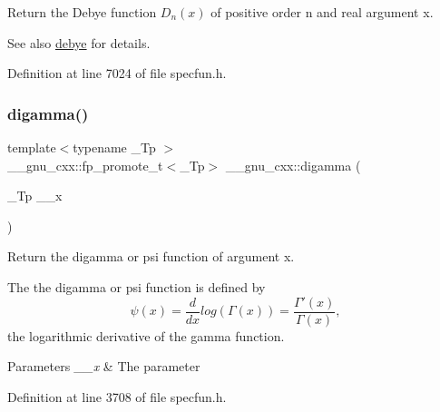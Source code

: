 Return the Debye function $ D_n(x) $ of positive order {\ttfamily n} and real argument {\ttfamily x}.

\begin{DoxySeeAlso}{See also}
\hyperlink{group__mathsf__gnu_ga0b14de47c011de3ebf771c9f29b2b78c}{debye} for details. 
\end{DoxySeeAlso}


Definition at line 7024 of file specfun.\+h.

\mbox{\label{group__mathsf__gnu_ga7b87300edf8754d959e1d94fe0c9246e}} 
\subsubsection{\texorpdfstring{digamma()}{digamma()}}
{\footnotesize\ttfamily template$<$typename \+\_\+\+Tp $>$ \\
\+\_\+\+\_\+gnu\+\_\+cxx\+::fp\+\_\+promote\+\_\+t$<$\+\_\+\+Tp$>$ \+\_\+\+\_\+gnu\+\_\+cxx\+::digamma (\begin{DoxyParamCaption}\item[{\+\_\+\+Tp}]{\+\_\+\+\_\+x }\end{DoxyParamCaption})\hspace{0.3cm}{\ttfamily [inline]}}

Return the digamma or psi function of argument {\ttfamily x}.

The the digamma or psi function is defined by \[ \psi(x) = \frac{d}{dx}log\left(\Gamma(x)\right) = \frac{\Gamma'(x)}{\Gamma(x)}, \] the logarithmic derivative of the gamma function.


\begin{DoxyParams}{Parameters}
{\em \+\_\+\+\_\+x} & The parameter \\
\hline
\end{DoxyParams}


Definition at line 3708 of file specfun.\+h.

\mbox{\label{group__mathsf__gnu_ga65b58ffe1d02ccda1113539b62d87b94}} 

